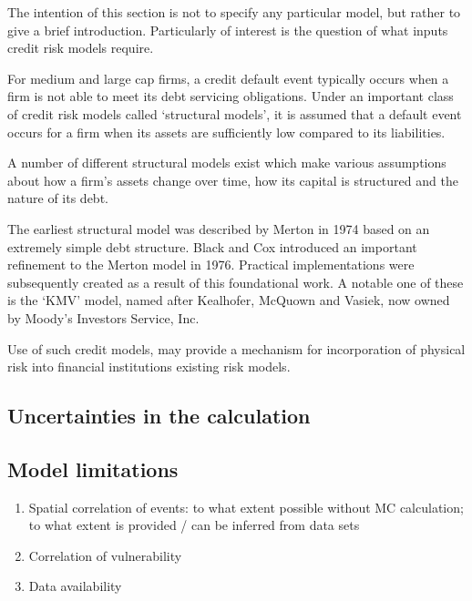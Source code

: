 \documentclass[a4paper,11pt]{extarticle} %
\begin{document}
The intention of this section is not to specify any particular model, but rather to give a brief introduction. Particularly of interest is the question of what inputs credit risk models require.

For medium and large cap firms, a credit default event typically occurs when a firm is not able to meet its debt servicing obligations. Under an important class of credit risk models called `structural models', it is assumed that a default event occurs for a firm when its assets are sufficiently low compared to its liabilities.

A number of different structural models exist which make various assumptions about how a firm's assets change over time, how its capital is structured and the nature of its debt.

The earliest structural model was described by Merton in 1974 \cite{Merton:1974} based on an extremely simple debt structure. Black and Cox \cite{BlackCox:1976} introduced an important refinement to the Merton model in 1976. Practical implementations were subsequently created as a result of this foundational work. A notable one of these is the `KMV' model, named after Kealhofer, McQuown and Vasiek, now owned by Moody's Investors Service, Inc.

Use of such credit models, may provide a mechanism for incorporation of physical risk into financial institutions existing risk models\cite{KenyonEtAl:2021}.

\subsection{Uncertainties in the calculation}

\subsection{Model limitations}

\begin{enumerate}
    \item Spatial correlation of events: to what extent possible without MC calculation; to what extent is provided / can be inferred from data sets
    \item Correlation of vulnerability
    \item Data availability
\end{enumerate}
\end{document}
